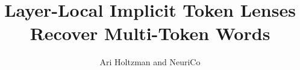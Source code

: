 \documentclass{article}
\title{Layer-Local Implicit Token Lenses Recover Multi-Token Words}
\author{Ari Holtzman and NeuriCo}
\begin{document}
\maketitle

\begin{abstract}

\end{abstract}










\end{document}
